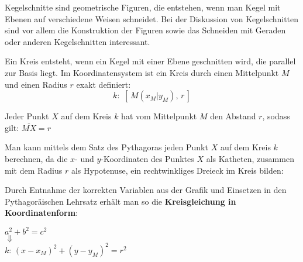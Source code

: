 



\thispagestyle{plain}

Kegelschnitte sind geometrische Figuren, die entstehen, wenn man Kegel mit Ebenen auf verschiedene Weisen schneidet. Bei der Diskussion von Kegelschnitten sind vor allem die Konstruktion der Figuren sowie das Schneiden mit Geraden oder anderen Kegelschnitten interessant.  


Ein Kreis entsteht, wenn ein Kegel mit einer Ebene geschnitten wird, die parallel zur Basis liegt. Im Koordinatensystem ist ein Kreis durch einen Mittelpunkt $M$ und einen Radius $r$ exakt definiert: $$k:\,\,[\,M(x_{M}|y_{M}),\, r\,]$$

Jeder Punkt $X$ auf dem Kreis $k$ hat vom Mittelpunkt $M$ den Abstand $r$, sodass gilt: $\overbar{MX} = r$

Man kann mittels dem Satz des Pythagoras jeden Punkt $X$ auf dem Kreis $k$ berechnen, da die $x$- und $y$-Koordinaten des Punktes $X$ als Katheten, zusammen mit dem Radius $r$ als Hypotenuse, ein rechtwinkliges Dreieck im Kreis bilden:

\begin{figure}[h!]
	\centering
\end{figure}

Durch Entnahme der korrekten Variablen aus der Grafik und Einsetzen in den Pythagor\"{a}ischen Lehrsatz erh\"{a}lt man so die \textbf{Kreisgleichung in Koordinatenform}:

\begin{center}
	$a^2 + b^2 = c^2$\\
	$\Downarrow$\\
	$k:\, (x - x_{M})^2 + (y - y_{M})^2 = r^2$
\end{center}

